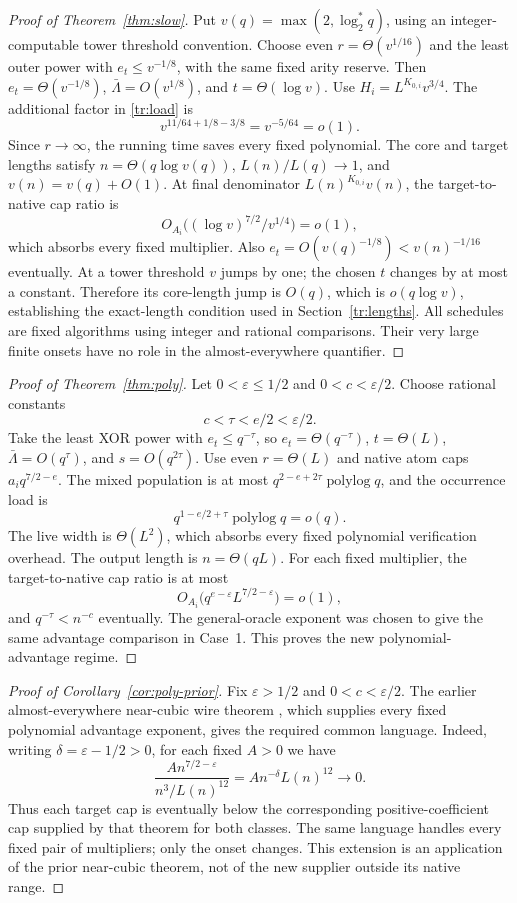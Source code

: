 \documentclass[11pt,letterpaper]{article}
\theoremstyle{definition}
\theoremstyle{remark}
\begin{document}
\begin{proof}[Proof of Theorem~\ref{thm:slow}]
Put $v(q)=\max(2,\log_2^*q)$, using an integer-computable tower
threshold convention. Choose even $r=\Theta(v^{1/16})$ and the least
outer power with $e_t\le v^{-1/8}$, with the same fixed arity reserve.
Then $e_t=\Theta(v^{-1/8})$,
$\bar\Lambda=O(v^{1/8})$, and $t=\Theta(\log v)$.
Use $H_i=L^{K_{0,i}}v^{3/4}$. The additional factor in
\eqref{tr:load} is
\[
 v^{11/64+1/8-3/8}=v^{-5/64}=o(1).
\]
Since $r\to\infty$, the running time saves every fixed polynomial.
The core and target lengths satisfy $n=\Theta(q\log v(q))$,
$L(n)/L(q)\to1$, and $v(n)=v(q)+O(1)$.
At final denominator $L(n)^{K_{0,i}}v(n)$, the target-to-native
cap ratio is
\[
 O_{A_i}\bigl((\log v)^{7/2}/v^{1/4}\bigr)=o(1),
\]
which absorbs every fixed multiplier. Also
$e_t=O(v(q)^{-1/8})<v(n)^{-1/16}$ eventually.
At a tower threshold $v$ jumps by one; the chosen $t$ changes by
at most a constant. Therefore its core-length jump is $O(q)$,
which is $o(q\log v)$, establishing the exact-length condition
used in Section~\ref{tr:lengths}.
All schedules are fixed algorithms using integer and rational
comparisons. Their very large finite onsets have no role in the
almost-everywhere quantifier.
\end{proof}

\begin{proof}[Proof of Theorem~\ref{thm:poly}]
Let $0<\varepsilon\le1/2$ and $0<c<\varepsilon/2$.
Choose rational constants
\[
 c<\tau<e/2<\varepsilon/2.
\]
Take the least XOR power with $e_t\le q^{-\tau}$, so
$e_t=\Theta(q^{-\tau})$, $t=\Theta(L)$,
$\bar\Lambda=O(q^\tau)$, and $s=O(q^{2\tau})$.
Use even $r=\Theta(L)$ and native atom caps $a_iq^{7/2-e}$.
The mixed population is at most
$q^{2-e+2\tau}\operatorname{polylog}q$, and the occurrence load is
\[
 q^{1-e/2+\tau}\operatorname{polylog}q=o(q).
\]
The live width is $\Theta(L^2)$, which absorbs every fixed
polynomial verification overhead. The output length is
$n=\Theta(qL)$. For each fixed multiplier, the target-to-native
cap ratio is at most
\[
 O_{A_i}\bigl(q^{e-\varepsilon}L^{7/2-\varepsilon}\bigr)=o(1),
\]
and $q^{-\tau}<n^{-c}$ eventually. The general-oracle exponent
was chosen to give the same advantage comparison in Case~1.
This proves the new polynomial-advantage regime.
\end{proof}

\begin{proof}[Proof of Corollary~\ref{cor:poly-prior}]
Fix $\varepsilon>1/2$ and $0<c<\varepsilon/2$. The earlier
almost-everywhere near-cubic wire theorem
\cite[Theorem~2.3]{NagCubic}, which supplies every fixed polynomial
advantage exponent, gives the required common language. Indeed,
writing $\delta=\varepsilon-1/2>0$, for each fixed $A>0$ we have
\[
 \frac{A n^{7/2-\varepsilon}}{n^3/L(n)^{12}}
 =A n^{-\delta}L(n)^{12}\longrightarrow0.
\]
Thus each target cap is eventually below the corresponding
positive-coefficient cap supplied by that theorem for both classes.
The same language handles every fixed pair of multipliers; only the
onset changes. This extension is an application of the prior
near-cubic theorem, not of the new supplier outside its native range.
\end{proof}
\end{document}
